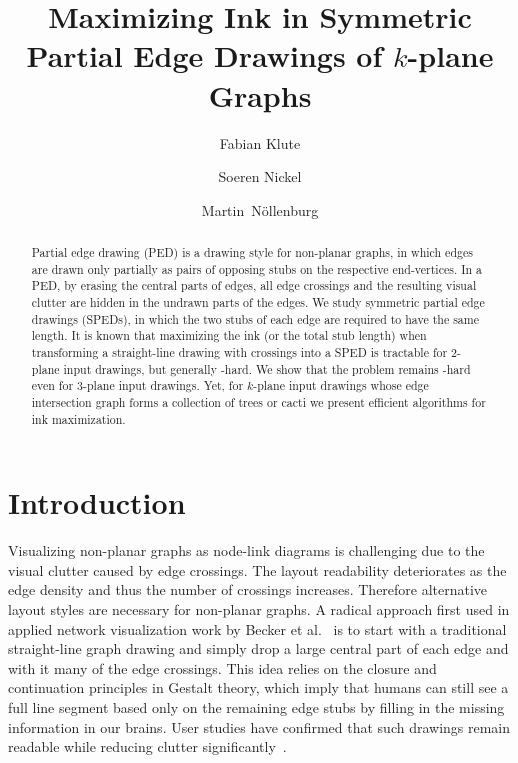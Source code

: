 \documentclass[a4paper, USenglish]{llncs}
\title{Maximizing Ink in Symmetric Partial Edge Drawings of $k$-plane Graphs}
\author{Fabian Klute \and Soeren Nickel \and Martin~N\"ollenburg}
\institute{Algorithms and Complexity Group, TU Wien, Vienna, Austria \email{[fklute|noellenburg]@ac.tuwien.ac.at, soeren.nickel@tuwien.ac.at}}
\begin{document}
	\maketitle
	
	\begin{abstract}
		Partial edge drawing (PED) is a drawing style for non-planar graphs, in which edges are drawn only partially as pairs of opposing stubs on the respective end-vertices. 
		In a PED, by erasing the central parts of edges, all edge crossings and the resulting visual clutter are hidden in the undrawn parts of the edges.
		We study symmetric partial edge drawings (SPEDs), in which the two stubs of each edge are required to have the same length. 
		It is known that maximizing the ink (or the total stub length) when transforming a straight-line drawing with crossings into a SPED is tractable for 2-plane input drawings, but generally \NP-hard.
		We show that the problem remains \NP-hard even for 3-plane input drawings.
		Yet, for $k$-plane input drawings whose edge intersection graph forms a collection of trees or cacti we present efficient algorithms for ink maximization.
	\end{abstract}

	\section{Introduction}
	
	Visualizing non-planar graphs as node-link diagrams is challenging due to the visual clutter caused by edge crossings. The layout readability deteriorates as the edge density and thus the number of crossings increases.
	Therefore alternative layout styles are necessary for non-planar graphs.
	A radical approach first used in applied network visualization work by Becker et al.~\cite{bew-vnd-95} is to start with a traditional straight-line graph drawing and simply drop a large central part of each edge and with it many of the edge crossings.
	This idea relies on the closure and continuation principles in Gestalt theory, which imply that humans can still see a full line segment based only on the remaining edge stubs by filling in the missing information in our brains.
	User studies have confirmed that such drawings remain readable while reducing clutter significantly~\cite{bvkw-epdldge-12,bkl-us-15}.
	
\end{document}

